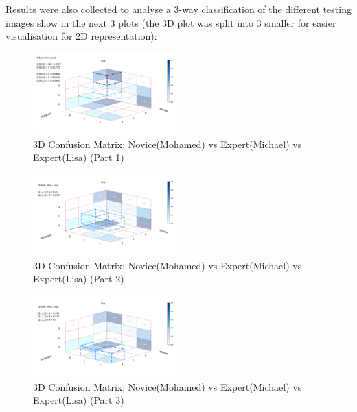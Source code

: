 \documentclass[a4paper]{article}
\begin{document}
        Results were also collected to analyse a 3-way classification of the different testing images show in the next 3 plots (the 3D plot was split into 3 smaller for easier visualisation for 2D representation):
        \begin{figure}[h!]
            \centerline{\includegraphics[width=0.5\textwidth]{../img/results/3dPlotPart1.pdf}}
            \label{figX: 3D Confusion Matrix (Part 1)} 
            \caption{3D Confusion Matrix; Novice(Mohamed) vs Expert(Michael) vs Expert(Lisa) (Part 1)}
        \end{figure}
        \begin{figure}[h!]
            \centerline{\includegraphics[width=0.5\textwidth]{../img/results/3dPlotPart2.pdf}}
            \label{figX: 3D Confusion Matrix (Part 2)} 
            \caption{3D Confusion Matrix; Novice(Mohamed) vs Expert(Michael) vs Expert(Lisa) (Part 2)}
        \end{figure}
        \begin{figure}[h!]
            \centerline{\includegraphics[width=0.5\textwidth]{../img/results/3dPlotPart3.pdf}}
            \label{figX: 3D Confusion Matrix (Part 3)} 
            \caption{3D Confusion Matrix; Novice(Mohamed) vs Expert(Michael) vs Expert(Lisa) (Part 3)}
        \end{figure}

\newpage
\end{document}
